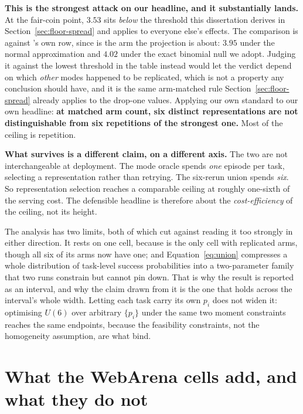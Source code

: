 \begin{scopebox}
\textbf{This is the strongest attack on our headline, and it substantially
lands.} At the fair-coin point, $3.53$\pp{} sits \emph{below} the threshold this
dissertation derives in Section~\ref{sec:floor-spread} and applies to everyone
else's effects. The comparison is against \mSoM{}'s own row, since \mSoM{} is
the arm the projection is about: $3.95$\pp{} under the normal approximation and
$4.02$\pp{} under the exact binomial null we adopt. Judging it against the
lowest threshold in the table instead would let the verdict depend on which
\emph{other} modes happened to be replicated, which is not a property any
conclusion should have, and it is the same arm-matched rule
Section~\ref{sec:floor-spread} already applies to the drop-one values.
Applying our own standard to our own headline: \textbf{at
matched arm count, six distinct representations are not distinguishable from six
repetitions of the strongest one.} Most of the ceiling is repetition.

\textbf{What survives is a different claim, on a different axis.} The two are not
interchangeable at deployment. The mode oracle spends \emph{one} episode per task, selecting a representation rather than retrying. The six-rerun union
spends \emph{six}. So representation selection reaches a comparable ceiling at
roughly one-sixth of the serving cost. The defensible headline is therefore
about the \emph{cost-efficiency} of the ceiling, not its height.
\end{scopebox}

The analysis has two limits, both of which cut against reading it too strongly in either direction. It rests on one cell, because  is the only
cell with replicated arms, though all six of its arms now have one; and
Equation~\ref{eq:union} compresses a whole distribution of task-level success
probabilities into a two-parameter family that two runs constrain but cannot pin
down. That is why the result is reported as an interval, and why the claim drawn
from it is the one that holds across the interval's whole width. Letting each
task carry its own $p_i$ does not widen it: optimising $U(6)$ over arbitrary
$\{p_i\}$ under the same two moment constraints reaches the same endpoints,
because the feasibility constraints, not the homogeneity assumption, are what
bind.

\FloatBarrier
\section{What the WebArena cells add, and what they do not}
\label{sec:wa-scope}

